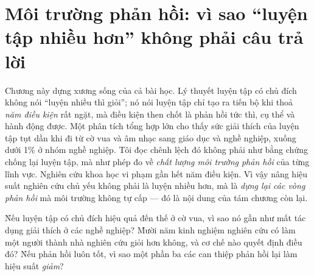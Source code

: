 \documentclass[../hieu-suat.tex]{subfiles}
\begin{document}
\chapter{Môi trường phản hồi: vì sao ``luyện tập nhiều hơn'' không phải câu trả lời}

\begin{tomtat}
Chương này dựng xương sống của cả bài học. Lý thuyết luyện tập có chủ đích không nói ``luyện nhiều thì giỏi''; nó nói luyện tập chỉ tạo ra tiến bộ khi thoả \emph{năm điều kiện} rất ngặt, mà điều kiện then chốt là phản hồi tức thì, cụ thể và hành động được. Một phân tích tổng hợp lớn cho thấy sức giải thích của luyện tập tụt dần khi đi từ cờ vua và âm nhạc sang giáo dục và nghề nghiệp, xuống dưới 1\% ở nhóm nghề nghiệp. Tôi đọc chênh lệch đó không phải như bằng chứng chống lại luyện tập, mà như phép đo về \emph{chất lượng môi trường phản hồi} của từng lĩnh vực. Nghiên cứu khoa học vi phạm gần hết năm điều kiện. Vì vậy nâng hiệu suất nghiên cứu chủ yếu không phải là luyện nhiều hơn, mà là \emph{dựng lại các vòng phản hồi} mà môi trường không tự cấp --- đó là nội dung của tám chương còn lại.
\end{tomtat}

\begin{nentang}
\end{nentang}

\begin{khoigoi}
\h{Nếu luyện tập có chủ đích hiệu quả đến thế ở cờ vua, vì sao nó gần như mất tác dụng giải thích ở các nghề nghiệp?}
\h{Mười năm kinh nghiệm nghiên cứu có làm một người thành nhà nghiên cứu giỏi hơn không, và cơ chế nào quyết định điều đó?}
\h{Nếu phản hồi luôn tốt, vì sao một phần ba các can thiệp phản hồi lại làm hiệu suất \emph{giảm}?}
\end{khoigoi}
\end{document}
